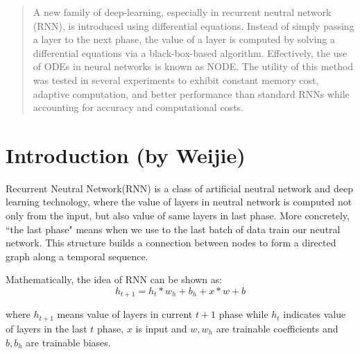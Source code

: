 \documentclass{article}
\begin{document}

\printAffiliationsAndNotice{\icmlEqualContribution} %

\begin{abstract}
    A new family of deep-learning, especially in recurrent neutral network (RNN), is introduced using differential equations. Instead of simply passing a layer to the next phase, the value of a layer is computed by solving a differential equations via a black-box-based algorithm. Effectively, the use of ODEs in neural networks is known as NODE. The utility of this method was tested in several experiments to exhibit constant memory cost, adaptive computation, and better performance than standard RNNs while accounting for accuracy and computational costs.
\end{abstract}

\section{Introduction (by Weijie)}
Recurrent Neutral Network(RNN) is a class of artificial neutral network and deep learning technology, where the value of layers in neutral network is computed not only from the input, but also value of same layers in last phase. More concretely, ``the last phase" means when we use to the last batch of data train our neutral network. This structure builds a connection between nodes to form a directed graph along a temporal sequence. 

Mathematically, the idea of RNN can be shown as:
\begin{equation}
    \label{equ:rnn}
    h_{t+1} = h_t*w_h + b_h + x*w + b
\end{equation}

where $h_{t+1}$ means value of layers in current $t+1$ phase while $h_t$ indicates value of layers in the last $t$ phase, $x$ is input and $w, w_h$ are trainable coefficients and $b, b_h$ are trainable biases.
\end{document}
